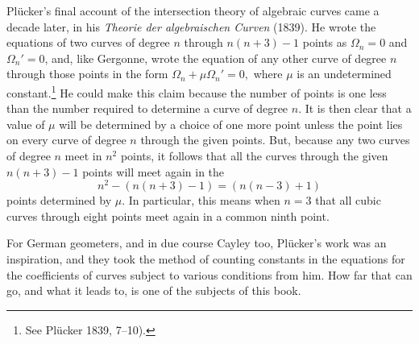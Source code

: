 Pl\"ucker's  final account  of the intersection theory of algebraic curves came a decade later, in his \emph{Theorie der algebraischen Curven} (1839).
He wrote the equations of two curves of degree $n$ through $ n(n+3) - 1$ points as 
$\Omega_n = 0$ and $\Omega_n ' = 0$, 
and, like Gergonne,  wrote the equation of any other curve of degree $n$ through those points in the form
$\Omega_n + \mu \Omega_n ' = 0,$
where $\mu$ is an undetermined constant.\footnote{See Pl\"ucker 1839, 7--10).} He could make this claim because the number of points is one less than the number required to determine a curve of degree $n.$ It is then clear that a value of $\mu$ will be determined by a choice of one more point unless the point lies on every curve of degree $n$ through the given points. But, because any two curves of degree $n$ meet in $n^2$ points, it follows that all the curves through the given $ n(n+3) - 1$ points will meet again in the 
\[n^2 - (n(n+3) - 1) =  (n(n-3) + 1)\]
points determined by $\mu.$ In particular, this means when $n = 3$ that all cubic curves through eight points meet again in a common ninth point.



For German geometers, and in due course Cayley too, Pl\"ucker's work was an inspiration, and they took the method of counting constants in the equations for the coefficients of curves subject to various conditions from him. How far that can go, and what it leads to, is one of the subjects of this book.

